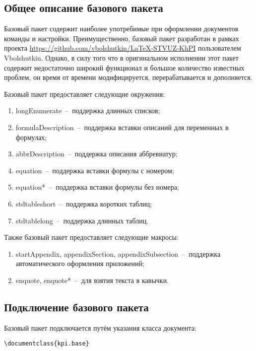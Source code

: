 \subsection{Общее описание базового пакета}
Базовый пакет содержит наиболее употребимые при оформлении документов команды и настройки. Преимущественно, базовый пакет разработан в рамках проекта \url{https://github.com/vbolshutkin/LaTeX-STVUZ-KhPI} пользователем Vbolshutkin. Однако, в силу того что в оригинальном исполнении этот пакет содержит недостаточно широкий функционал и большое количество известных проблем, он время от времени модифицируется, перерабатывается и дополняется.\par
Базовый пакет предоставляет следующие окружения:
\begin{enumerate}
\item longEnumerate~--~поддержка длинных списков;
\item formulaDescription~--~поддержка вставки описаний для переменных в формулах;
\item abbrDescription~--~поддержка описания аббревиатур;
\item equation~--~поддержка вставки формулы с номером;
\item equation*~--~поддержка вставки формулы без номера;
\item stdtableshort~--~поддержка коротких таблиц;
\item stdtablelong~--~поддержка длинных таблиц.
\end{enumerate}

Также базовый пакет предоставляет следующие макросы:
\begin{enumerate}
  \item startAppendix, appendixSection, appendixSubsection~--~поддержка автоматического оформления приложений;
  \item enquote, enquote*~--~для взятия текста в кавычки.
\end{enumerate}
\subsection{Подключение базового пакета}
Базовый пакет подключается путём указания класса документа:
{\small
\begin{Verbatim}
\documentclass{kpi.base}
\end{Verbatim}}
\normalsize